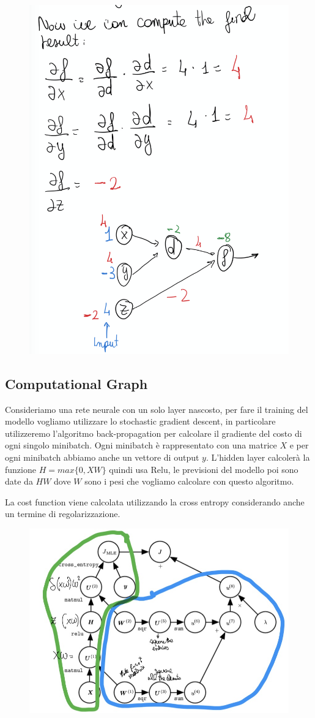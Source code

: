 \documentclass[14pt]{extreport}
\begin{document}
\begin{figure}[H]
\centering
\includegraphics[width=0.7\linewidth]{432.jpeg}
\end{figure}

\subsection{Computational Graph}

Consideriamo una rete neurale con un solo layer nascosto, per fare il training del modello vogliamo utilizzare lo stochastic gradient descent, in
particolare utilizzeremo l'algoritmo back-propagation per calcolare il gradiente del costo di ogni singolo minibatch. Ogni minibatch è rappresentato
con una matrice $X$ e per ogni minibatch abbiamo anche un vettore di output $y$. L'hidden layer calcolerà la funzione $H = max\{0, XW\}$ quindi usa
Relu, le previsioni del modello poi sono date da $HW$ dove $W$ sono i pesi che vogliamo calcolare con questo algoritmo.

La cost function viene calcolata utilizzando la cross entropy considerando anche un termine di regolarizzazione.


\begin{figure}[H]
\centering
\includegraphics[width=0.7\linewidth]{396.jpeg}
\end{figure}
\end{document}
